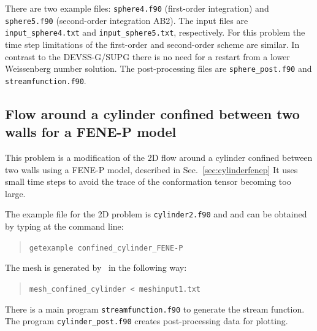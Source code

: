 There are two example files: 
\texttt{sphere4.f90} (first-order integration) and
\texttt{sphere5.f90} (second-order integration AB2).
The input files are \texttt{input\_sphere4.txt} and \texttt{input\_sphere5.txt}, respectively.
For this problem the time step limitations of the first-order and second-order
scheme are similar.
In contrast to the DEVSS-G/SUPG there is no need for a restart from a lower
Weissenberg number solution.
The post-processing files are \texttt{sphere\_post.f90} and 
\texttt{streamfunction.f90}.


\subsection{Flow around a cylinder confined between two walls for a FENE-P
model}
\label{sec:cylinderfenepdg}

This problem is a modification of the 
2D flow around a cylinder confined between two walls using a FENE-P model,
described in Sec.~\ref{sec:cylinderfenep} It uses small time steps to avoid the
trace of the conformation tensor becoming too large.

The example file for the 2D problem is \texttt{cylinder2.f90} and
and can be obtained by typing at the
command line:
\begin{quote}
   \texttt{getexample confined\_cylinder\_FENE-P}
\end{quote}
The mesh is generated by \tfem\ in the
following way:
\begin{quote}
   \texttt{mesh\_confined\_cylinder < meshinput1.txt}
\end{quote}

There is a main program \texttt{streamfunction.f90} to
generate the stream function. 
The program \texttt{cylinder\_post.f90}
creates post-processing data for plotting.

